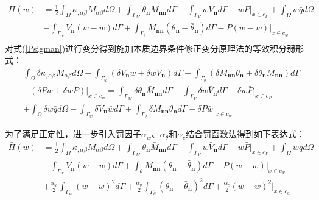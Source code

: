 \begin{equation}\label{Psigman}
\begin{split}
    \bar{\Pi}(w)&=\frac{1}{2}\int_{\Omega}\kappa_{,\alpha\beta}M_{\alpha\beta}d\Omega+\int_{\Gamma_M}\theta_{\pmb{n}}\bar{M}_{\pmb{nn}}d\Gamma-\int_{\Gamma_V}w\bar{V}_{\pmb{n}}d\Gamma-w\bar{P}\vert_{x\in c_P}+\int_{\Omega}w\bar{q}d\Omega\\
    &-\int_{\Gamma_w}V_{\pmb{n}}(w-\bar{w})d\Gamma+\int_{\Gamma_{\theta}}M_{\pmb{nn}}(\theta_{\pmb{n}}-\bar{\theta}_{\pmb{n}})d\Gamma-P(w-\bar{w})\vert_{x\in c_w}\\
\end{split}
\end{equation}
对式(\ref{Psigman})进行变分得到施加本质边界条件修正变分原理法的等效积分弱形式：
\begin{equation}
\begin{split}
    &\int_{\Omega}\delta\kappa_{,\alpha\beta}M_{\alpha\beta}d\Omega-\int_{\Gamma_w}(\delta V_{\pmb{n}}w+\delta wV_{\pmb{n}})d\Gamma+\int_{\Gamma_{\theta}}(\delta M_{\pmb{nn}}\theta_{\pmb{n}}+\delta\theta_{\pmb{n}}M_{\pmb{nn}})d\Gamma\\
    &-(\delta Pw+\delta wP)\vert_{x\in c_w}=\int_{\Gamma_M}\delta\theta_{\pmb{n}}\bar{M}_{\pmb{nn}}d\Gamma-\int_{\Gamma_V}\delta w\bar{V}_{\pmb{n}}d\Gamma-\delta w\bar{P}\vert_{x\in c_P}\\
    &+\int_{\Omega}\delta w\bar{q}d\Omega-\int_{\Gamma_w}\delta V_{\pmb{n}}\bar{w}d\Gamma+\int_{\Gamma_{\theta}}\delta M_{\pmb{nn}}\bar{\theta}_{\pmb{n}}d\Gamma-\delta P\bar{w}\vert_{x\in c_w}
\end{split}
\end{equation}\par
为了满足正定性，进一步引入罚因子$\alpha_w$、$\alpha_\theta$和$\alpha_c$结合罚函数法得到如下表达式：
\begin{equation}\label{Pnitsche}
\begin{split}
    \bar{\Pi}(w)&=\frac{1}{2}\int_{\Omega}\kappa_{,\alpha\beta}M_{\alpha\beta}d\Omega+\int_{\Gamma_M}\theta_{\pmb{n}}\bar{M}_{\pmb{nn}}d\Gamma-\int_{\Gamma_V}w\bar{V}_{\pmb{n}}d\Gamma-w\bar{P}\vert_{x\in c_P}+\int_{\Omega}w\bar{q}d\Omega\\
&-\int_{\Gamma_w}V_{\pmb{n}}(w-\bar{w})d\Gamma+\int_{\theta}M_{\pmb{nn}}(\theta_{\pmb{n}}-\bar{\theta}_{\pmb{n}})d\Gamma-P(w-\bar{w})\vert_{x\in c_w}\\
&+\frac{\alpha_w}{2}\int_{\Gamma_w}(w-\bar{w})^2d\Gamma+\frac{\alpha_{\theta}}{2}\int_{\Gamma_{\theta}}(\theta_{\pmb{n}}-\bar{\theta}_{\pmb{n}})^2d\Gamma+\frac{\alpha_c}{2}(w-\bar{w})^2\vert_{x\in c_w}
\end{split}
\end{equation}
